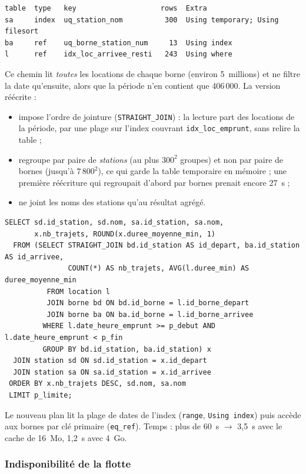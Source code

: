 \begin{lstlisting}[style=sql]
table  type   key                    rows  Extra
sa     index  uq_station_nom          300  Using temporary; Using filesort
ba     ref    uq_borne_station_num     13  Using index
l      ref    idx_loc_arrivee_resti   243  Using where
\end{lstlisting}

Ce chemin lit \emph{toutes} les locations de chaque borne (environ 5~millions) et ne filtre la date qu'ensuite, alors que la période n'en contient que 406\,000. La version réécrite :
\begin{itemize}
	\item impose l'ordre de jointure (\texttt{STRAIGHT\_JOIN}) : la lecture part des locations de la période, par une plage sur l'index couvrant \texttt{idx\_loc\_emprunt}, sans relire la table ;
	\item regroupe par paire de \emph{stations} (au plus $300^2$ groupes) et non par paire de bornes (jusqu'à $7\,800^2$), ce qui garde la table temporaire en mémoire ; une première réécriture qui regroupait d'abord par bornes prenait encore 27~s ;
	\item ne joint les noms des stations qu'au résultat agrégé.
\end{itemize}

\begin{lstlisting}[style=sql]
SELECT sd.id_station, sd.nom, sa.id_station, sa.nom,
       x.nb_trajets, ROUND(x.duree_moyenne_min, 1)
  FROM (SELECT STRAIGHT_JOIN bd.id_station AS id_depart, ba.id_station AS id_arrivee,
               COUNT(*) AS nb_trajets, AVG(l.duree_min) AS duree_moyenne_min
          FROM location l
          JOIN borne bd ON bd.id_borne = l.id_borne_depart
          JOIN borne ba ON ba.id_borne = l.id_borne_arrivee
         WHERE l.date_heure_emprunt >= p_debut AND l.date_heure_emprunt < p_fin
         GROUP BY bd.id_station, ba.id_station) x
  JOIN station sd ON sd.id_station = x.id_depart
  JOIN station sa ON sa.id_station = x.id_arrivee
 ORDER BY x.nb_trajets DESC, sd.nom, sa.nom
 LIMIT p_limite;
\end{lstlisting}

Le nouveau plan lit la plage de dates de l'index (\texttt{range}, \texttt{Using index}) puis accède aux bornes par clé primaire (\texttt{eq\_ref}). Temps : plus de 60~s $\to$ 3,5~s avec le cache de 16~Mo, 1,2~s avec 4~Go.

\subsubsection{Indisponibilité de la flotte}

